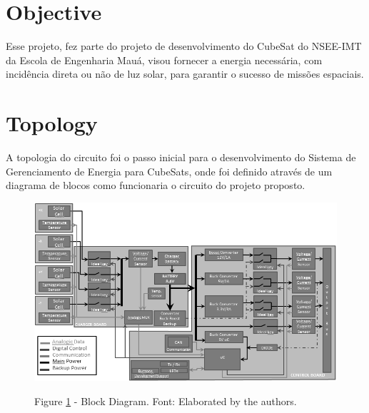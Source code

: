 \documentclass[final,3p,times,twocolumn,authoryear]{elsarticle}
\begin{document}

\section{Objective}
\label{Objective}

	Esse projeto, fez parte do projeto de desenvolvimento do CubeSat do NSEE-IMT da Escola de Engenharia Mauá, visou fornecer a energia necessária, com incidência direta ou não de luz solar, para garantir o sucesso de missões espaciais.

\section{Topology}
\label{Topologia}

	A topologia do circuito foi o passo inicial para o desenvolvimento do Sistema de Gerenciamento de Energia para CubeSats, onde foi definido através de um diagrama de blocos como funcionaria o circuito do projeto proposto.

	\begin{figure}[th]
		\label{Fig_diag}
		\centering
		\includegraphics[width=1.0\linewidth]{./figs/diag}
			
		\begin{small}
		Figure \ref{Fig_diag} - Block Diagram. Font: Elaborated by the authors.
		\end{small}		
	\end{figure}
	\pagebreak
	
	
	
\end{document}
